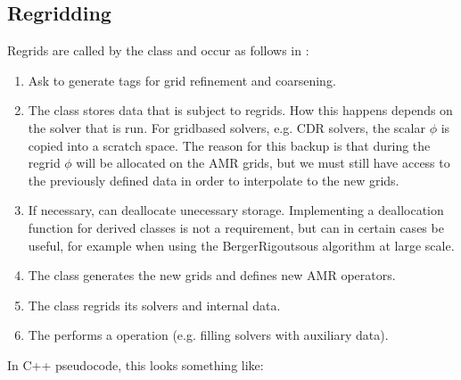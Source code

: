 \documentclass[letterpaper,10pt,english]{sphinxmanual}
\begin{document}
\subsection{Regridding}
\label{\detokenize{Source/Driver:regridding}}
Regrids are called by the  class and occur as follows in :
\begin{enumerate}
%
\item {} 
Ask  to generate tags for grid refinement and coarsening.

\item {} 
The  class stores data that is subject to regrids.
How this happens depends on the solver that is run.
For grid\sphinxhyphen{}based solvers, e.g. CDR solvers, the scalar \(\phi\) is copied into a scratch space.
The reason for this backup is that during the regrid \(\phi\) will be allocated on the  AMR grids, but we must still have access to the previously defined data in order to interpolate to the new grids.

\item {} 
If necessary,  can deallocate unecessary storage.
Implementing a deallocation function for \sphinxhyphen{}derived classes is not a requirement, but can in certain cases be useful, for example when using the Berger\sphinxhyphen{}Rigoutsous algorithm at large scale.

\item {} 
The  class generates the new grids and defines new AMR operators.

\item {} 
The  class regrids its solvers and internal data.

\item {} 
The  performs a  operation (e.g. filling solvers with auxiliary data).

\end{enumerate}

In C++ pseudo\sphinxhyphen{}code, this looks something like:
\end{document}
